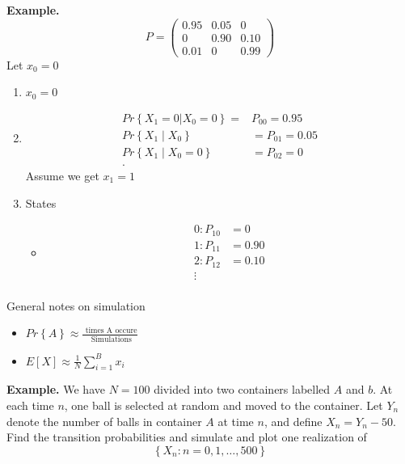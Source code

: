\documentclass{article}
\theoremstyle{remark}
\begin{document}
 \begin{tcolorbox}
   \textbf{Example.}
   \[
   P = \begin{pmatrix}
   0.95  &  0.05  &  0 \\
   0  &  0.90  &  0.10 \\
   0.01  &  0  &  0.99
   \end{pmatrix}
   \]
   Let $x_{0} = 0$
   \begin{enumerate}
     \item $x_{0} = 0$
     \item
       \begin{align*}
       Pr \left \{ X_{1} = 0 | X_{0} = 0 \right \} = &  P_{00} = 0.95  \\
       Pr \left \{ X_{1}  \mid  X_{0}  \right \}  &=  P_{01} = 0.05 \\
       Pr \left \{ X_{1}  \mid  X_{0} = 0 \right \}  &=  P_{02} = 0 \\
       .\end{align*}
       Assume we get $x_{1} = 1$
     \item States
       \begin{itemize}
         \item \[
             \begin{split}
         0: P_{10}  &=  0 \\
         1: P_{11 } &=  0.90 \\
         2: P_{12} &=  0.10 \\
         \vdots  \\
             \end{split}
         \]
       \end{itemize}
   \end{enumerate}
 \end{tcolorbox}

 \begin{tcolorbox}
   General notes on simulation
   \begin{itemize}
     \item
   $Pr \left \{ A  \right \} \approx \frac{\text{ times A occure}}{ \text{ Simulations}}  $
 \item $E\left[ X \right] \approx \frac{1}{N}  \sum_{i=1}^{B}  x_{i}$
   \end{itemize}
 \end{tcolorbox}

   \textbf{Example.} We have $N=100$ divided into two containers labelled $A$ and $ b$. At each time $n$, one ball is selected at random and moved to the container. Let $Y_{n}$ denote the number of balls in container $A$ at time $n$, and define $X_{n} = Y_{n} -50$. Find the transition probabilities and simulate and plot one realization of \[
   \left\{ X_{n}: n  = 0,1, \ldots, 500 \right\}
   \]
\end{document}
